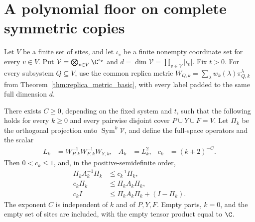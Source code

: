 
\section{A polynomial floor on complete symmetric copies}

\begin{theorem}
    \label{thm:replica_symmetric_floor}
    \leanok
    Let $V$ be a finite set of sites, and let $\iota_v$ be a finite nonempty
    coordinate set for every $v\in V$. Put
    $\mathcal V=\bigotimes_{v\in V}\C^{\iota_v}$ and
    $d=\dim\mathcal V=\prod_{v\in V}|\iota_v|$. Fix $t>0$. For every
    subsystem $Q\subseteq V$, use the common replica metric
    $W_{Q,k}=\sum_\lambda w_k(\lambda)\pi^\lambda_{Q,k}$ from
    Theorem~\ref{thm:replica_metric_basic}, with every label padded to the
    same full dimension $d$.

    There exists $C\ge0$, depending on the fixed system and $t$, such that
    the following holds for every $k\ge0$ and every pairwise disjoint
    cover $P\cup Y\cup F=V$. Let $\Pi_k$ be the orthogonal projection onto
    $\operatorname{Sym}^k\mathcal V$, and define the full-space operators
    and the scalar
    \begin{align}
        L_k & =W_{P,k}^{-1}W_{F,k}^{-1}W_{Y,k}, &
        A_k & =L_k^2,                           &
        c_k & =(k+2)^{-C}.
        \label{eq:replica_floor_metric}
    \end{align}
    Then $0<c_k\le1$, and, in the positive-semidefinite order,
    \begin{align}
        \Pi_k A_k^{-1}\Pi_k & \le c_k^{-1}\Pi_k,
        \label{eq:replica_floor_inverse}                   \\
        c_k\Pi_k            & \le\Pi_k A_k\Pi_k,
        \label{eq:replica_floor_symmetric}                 \\
        c_k I               & \le\Pi_k A_k\Pi_k+(I-\Pi_k).
        \label{eq:replica_floor_extension}
    \end{align}
    The exponent $C$ is independent of $k$ and of $P,Y,F$. Empty parts,
    $k=0$, and the empty set of sites are included, with the empty tensor
    product equal to $\C$.
\end{theorem}

